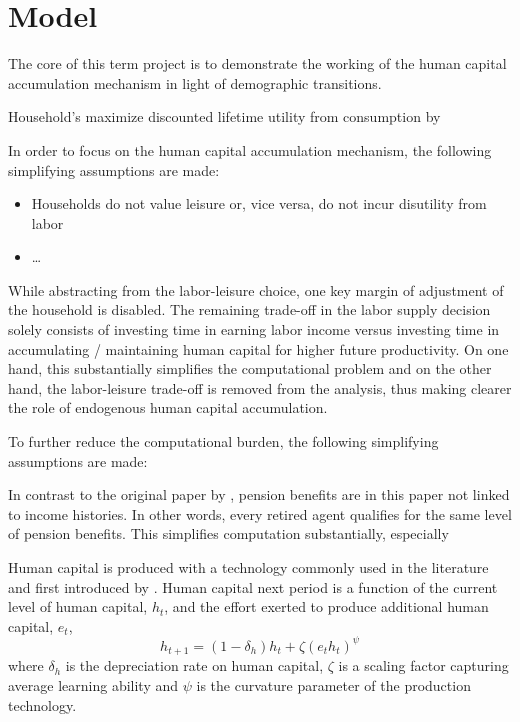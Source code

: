 \section{Model}
\label{sec:model}

The core of this term project is to demonstrate the working of the human capital accumulation mechanism in light of demographic transitions.

Household's maximize discounted lifetime utility from consumption by

In order to focus on the human capital accumulation mechanism, the following simplifying assumptions are made:
\begin{itemize}
    \item Households do not value leisure or, vice versa, do not incur disutility from labor
    \item \dots
\end{itemize}

While abstracting from the labor-leisure choice, one key margin of adjustment of the household is disabled. The remaining trade-off in the labor supply decision solely consists of investing time in earning labor income versus investing time in accumulating / maintaining human capital for higher future productivity. On one hand, this substantially simplifies the computational problem and on the other hand, the labor-leisure trade-off is removed from the analysis, thus making clearer the role of endogenous human capital accumulation.

To further reduce the computational burden, the following simplifying assumptions are made:

In contrast to the original paper by \cite{LudwigSchelkleVogel2012}, pension benefits are in this paper not linked to income histories. In other words, every retired agent qualifies for the same level of pension benefits. This simplifies computation substantially, especially

Human capital is produced with a technology commonly used in the literature and first introduced by \cite{Ben-Porath1967}. Human capital next period is a function of the current level of human capital, $h_t$, and the effort exerted to produce additional human capital, $e_t$,
$$ h_{t+1} = (1-\delta_h) h_t + \zeta (e_t h_t)^\psi$$
where $\delta_h$ is the depreciation rate on human capital, $\zeta$ is a scaling factor capturing average learning ability and $\psi$ is the curvature parameter of the production technology.

